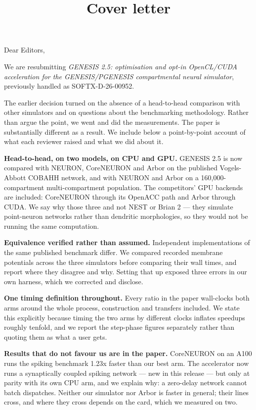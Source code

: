 \documentclass[11pt,a4paper]{article}
\title{\vspace{-2em}Cover letter}
\date{}
\author{}
\begin{document}
\maketitle\vspace{-3em}
Dear Editors,

We are resubmitting \emph{GENESIS 2.5: optimisation and opt-in OpenCL/CUDA acceleration for the GENESIS/PGENESIS compartmental neural simulator}, previously handled as SOFTX-D-26-00952.

The earlier decision turned on the absence of a head-to-head comparison with other simulators and on questions about the benchmarking methodology. Rather than argue the point, we went and did the measurements. The paper is substantially different as a result. We include below a point-by-point account of what each reviewer raised and what we did about it.

\textbf{Head-to-head, on two models, on CPU and GPU.} GENESIS 2.5 is now compared with NEURON, CoreNEURON and Arbor on the published Vogels-Abbott COBAHH network, and with NEURON and Arbor on a 160,000-compartment multi-compartment population. The competitors' GPU backends are included: CoreNEURON through its OpenACC path and Arbor through CUDA. We say why those three and not NEST or Brian 2 --- they simulate point-neuron networks rather than dendritic morphologies, so they would not be running the same computation.

\textbf{Equivalence verified rather than assumed.} Independent implementations of the same published benchmark differ. We compared recorded membrane potentials across the three simulators before comparing their wall times, and report where they disagree and why. Setting that up exposed three errors in our own harness, which we corrected and disclose.

\textbf{One timing definition throughout.} Every ratio in the paper wall-clocks both arms around the whole process, construction and transfers included. We state this explicitly because timing the two arms by different clocks inflates speedups roughly tenfold, and we report the step-phase figures separately rather than quoting them as what a user gets.

\textbf{Results that do not favour us are in the paper.} CoreNEURON on an A100 runs the spiking benchmark 1.23x faster than our best arm. The accelerator now runs a synaptically coupled spiking network --- new in this release --- but only at parity with its own CPU arm, and we explain why: a zero-delay network cannot batch dispatches. Neither our simulator nor Arbor is faster in general; their lines cross, and where they cross depends on the card, which we measured on two.
\end{document}
